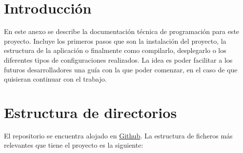 
\section{Introducción}
En este anexo se describe la documentación técnica de programación para este proyecto. Incluye los primeros pasos que son la instalación del proyecto, la estructura de la aplicación o finalmente como compilarlo, desplegarlo o los diferentes tipos de configuraciones realizados. La idea es poder facilitar a los futuros desarrolladores una guía con la que poder comenzar, en el caso de que quisieran continuar con el trabajo.

\section{Estructura de directorios}
El repositorio se encuentra alojado en \href{https://github.com/scc0034/flutter_serpiente}{Github}. La estructura de ficheros más relevantes que tiene el proyecto es la siguiente:

